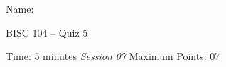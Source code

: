\documentclass[11pt,paper=a4,answers]{exam}
\begin{document}

\noindent
\begin{minipage}[l]{.5\textwidth}%
\noindent
Name: \underline{\hspace{7cm}}
\end{minipage}
\hfill
\begin{minipage}[r]{0.22\textwidth}%
\begin{center}
{%
\large BISC 104 -- Quiz 5\\[2pt]} %
\end{center}
\end{minipage}
\par
\noindent
\uline{Time: 5 minutes   \hfill \normalsize\emph{\underline{Session 07}} \hfill        Maximum Points: 07}
\end{document}
